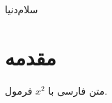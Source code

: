 \documentclass{article}
\begin{document}
سلام‌دنیا
\section{مقدمه}
متن فارسی با $x^2$ فرمول.
\end{document}
